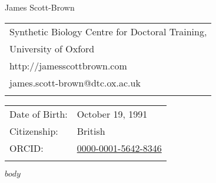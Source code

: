 \documentclass[letterpaper]{article}
\def\name{James Scott-Brown}
\begin{document}
{\huge \name}


\vspace{0.25in}
\begin{minipage}[t]{0.5\textwidth}
\begin{tabular}{l}  	
Synthetic Biology Centre for Doctoral Training,\\
University of Oxford\\
http://jamesscottbrown.com\\
james.scott-brown@dtc.ox.ac.uk \\ \\
\end{tabular}
\end{minipage}
\begin{minipage}[t]{0.5\textwidth}
\begin{tabular}{ll}  	
Date of Birth: &October 19, 1991 \\
Citizenship: &British \\
ORCID: &\href{https://orcid.org/0000-0001-5642-8346}{0000-0001-5642-8346} \\ \\
\end{tabular}
\end{minipage}

$body$

\vspace{0.3 cm}
\end{document}
